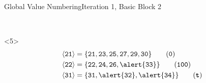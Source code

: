 \documentclass{beamer}
\newcommand{\vn}[1]{\ensuremath{\langle\texttt{#1}\rangle}}
\newcommand{\vreg}[1]{\texttt{#1}}
\begin{document}
\begin{frame}[fragile]{Global Value Numbering}{Iteration 1, Basic Block 2}
\begin{columns}[t,onlytextwidth]
\begin{column}{.5\textwidth}
\begin{onlyenv}
\begin{align*}
        \end{align*}
      \end{onlyenv}
      \begin{onlyenv}<5>
        \begin{align*}
          \vn{21} &= \{\vreg{21},
                       \vreg{23},
                       \vreg{25},
                       \vreg{27},
                       \vreg{29},
                       \vreg{30}\} \tag{\texttt{0}} \\
          \vn{22} &= \{\vreg{22},
                       \vreg{24},
                       \vreg{26},
                       \alert{\vreg{33}}\} \tag{\texttt{100}} \\
          \vn{31} &= \{\vreg{31},
                       \alert{\vreg{32}},
                       \alert{\vreg{34}}\} \tag{\texttt{\textbf{t}}}
        \end{align*}
      \end{onlyenv}
    \end{column}
  \end{columns}
\end{frame}
\end{document}
